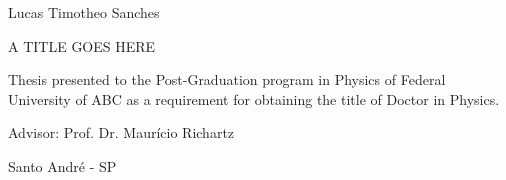 \documentclass[12pt, twoside]{report}
\begin{document}

\begin{center}
  Lucas Timotheo Sanches
  \par\end{center}

\vspace{3cm}


\begin{center}
  {\huge{}A TITLE GOES HERE}{\huge\par}
  \par\end{center}

\begin{center}
  \vspace{4cm}
  \par\end{center}


\begin{center}
  \begin{minipage}[t]{0.6\columnwidth}
    \begin{center}
      Thesis presented to the Post-Graduation program in Physics of
      Federal University of ABC as a requirement for obtaining the title
      of Doctor in Physics.
      \par\end{center}
  \end{minipage}
  \par\end{center}


\begin{center}
  \vspace{2cm}
  Advisor: Prof. Dr. Maurício Richartz
  \par\end{center}


\begin{center}
  \vspace{3cm}
  Santo André - SP
  \par\end{center}

\end{document}
